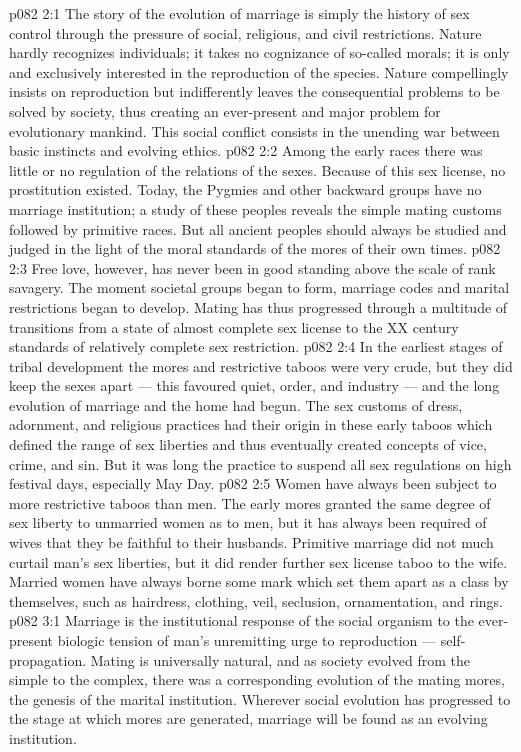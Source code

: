 \vs p082 2:1 The story of the evolution of marriage is simply the history of sex control through the pressure of social, religious, and civil restrictions. Nature hardly recognizes individuals; it takes no cognizance of so\hyp{}called morals; it is only and exclusively interested in the reproduction of the species. Nature compellingly insists on reproduction but indifferently leaves the consequential problems to be solved by society, thus creating an ever\hyp{}present and major problem for evolutionary mankind. This social conflict consists in the unending war between basic instincts and evolving ethics.
\vs p082 2:2 \pc Among the early races there was little or no regulation of the relations of the sexes. Because of this sex license, no prostitution existed. Today, the Pygmies and other backward groups have no marriage institution; a study of these peoples reveals the simple mating customs followed by primitive races. But all ancient peoples should always be studied and judged in the light of the moral standards of the mores of their own times.
\vs p082 2:3 Free love, however, has never been in good standing above the scale of rank savagery. The moment societal groups began to form, marriage codes and marital restrictions began to develop. Mating has thus progressed through a multitude of transitions from a state of almost complete sex license to the XX century standards of relatively complete sex restriction.
\vs p082 2:4 In the earliest stages of tribal development the mores and restrictive taboos were very crude, but they did keep the sexes apart --- this favoured quiet, order, and industry --- and the long evolution of marriage and the home had begun. The sex customs of dress, adornment, and religious practices had their origin in these early taboos which defined the range of sex liberties and thus eventually created concepts of vice, crime, and sin. But it was long the practice to suspend all sex regulations on high festival days, especially May Day.
\vs p082 2:5 \pc Women have always been subject to more restrictive taboos than men. The early mores granted the same degree of sex liberty to unmarried women as to men, but it has always been required of wives that they be faithful to their husbands. Primitive marriage did not much curtail man’s sex liberties, but it did render further sex license taboo to the wife. Married women have always borne some mark which set them apart as a class by themselves, such as hairdress, clothing, veil, seclusion, ornamentation, and rings.
\vs p082 3:1 Marriage is the institutional response of the social organism to the ever\hyp{}present biologic tension of man’s unremitting urge to reproduction --- self\hyp{}propagation. Mating is universally natural, and as society evolved from the simple to the complex, there was a corresponding evolution of the mating mores, the genesis of the marital institution. Wherever social evolution has progressed to the stage at which mores are generated, marriage will be found as an evolving institution.
